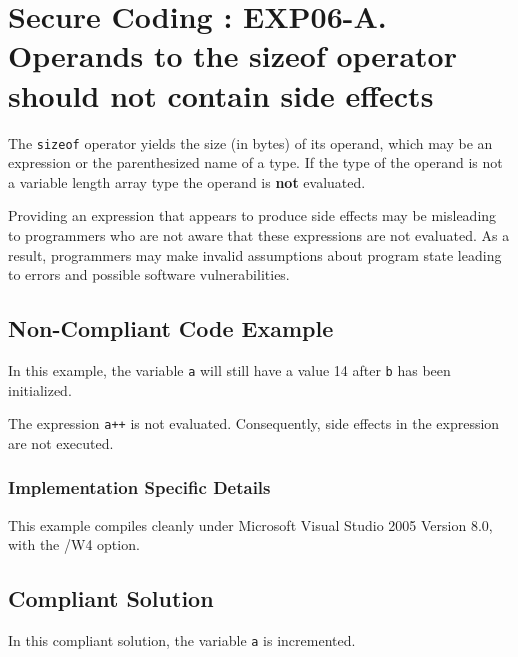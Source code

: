 
   \section{Secure Coding : EXP06-A. Operands to the sizeof operator should not contain side effects}

   The {\tt sizeof} operator yields the size (in bytes) of its operand, which may be an expression or the parenthesized name of a type. If the type of the operand is not a variable length array type the operand is {\bf not} evaluated.

   Providing an expression that appears to produce side effects may be misleading to programmers who are not aware that these expressions are not evaluated. As a result, programmers may make invalid assumptions about program state leading to errors and possible software vulnerabilities.
   \subsection{Non-Compliant Code Example}

   In this example, the variable {\tt a} will still have a value 14 after {\tt b} has been initialized.


   The expression {\tt a++} is not evaluated. Consequently, side effects in the expression are not executed.
   \subsubsection{Implementation Specific Details}

   This example compiles cleanly under Microsoft Visual Studio 2005 Version 8.0, with the /W4 option.
   \subsection{Compliant Solution}

   In this compliant solution, the variable {\tt a} is incremented.

